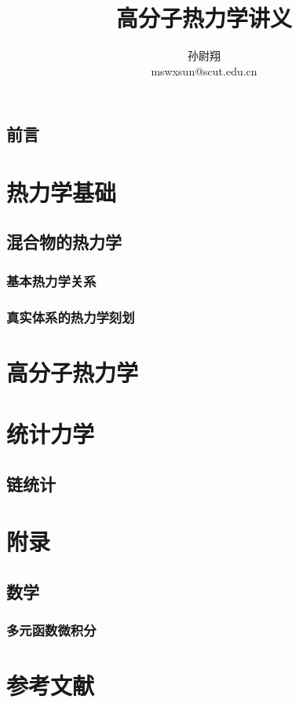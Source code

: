 \documentclass[zihao=5,linespread=1.3,b5paper,heading=true,twoside]{ctexbook}
\title{高分子热力学讲义}
\author{孙尉翔\\mswxsun@scut.edu.cn}
\theoremstyle{definition}
\theoremstyle{plain}
\begin{document}
\chapter*{前言}\label{sec:preface}


\newpage\tableofcontents

\part{热力学基础}
\chapter{混合物的热力学}
\section{基本热力学关系}

\section{真实体系的热力学刻划}



\part{高分子热力学}
\part{统计力学}
\chapter{链统计}

\part{附录}
\chapter{数学}
\section{多元函数微积分}



\newpage\part*{参考文献}
\printbibliography[heading=none]
\end{document}
